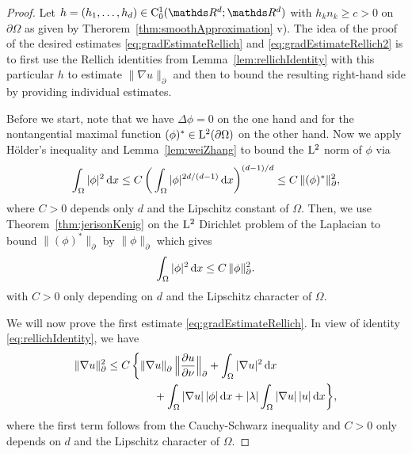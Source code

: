 \begin{proof}
  Let $h = (h_1, \dots, h_d) \in \CC_0^1(\R^d; \R^d)$ with $h_k n_k \geq c > 0$ on $\partial \Omega$ as given by Therorem~\ref{thm:smoothApproximation} v). 
  The idea of the proof of the desired estimates \eqref{eq:gradEstimateRellich} and \eqref{eq:gradEstimateRellich2} is to first use the Rellich identities from Lemma~\ref{lem:rellichIdentity} with this particular $h$ to estimate $\|\nabla u\|^{}_\partial$ and then to bound the resulting right-hand side by providing individual estimates.

  Before we start, note that we have $\Delta \phi = 0$ on the one hand and for the nontangential maximal function $(\phi)^* \in \mathrm{L}^2(\partial\Omega)$ on the other hand. 
  Now we apply Hölder's inequality and Lemma~\ref{lem:weiZhang} to bound the $\mathrm{L}^2$ norm of $\phi$ via
  \begin{align*}
    \int_\Omega |\phi|^2 \, {\operatorname{d}\!{x}} 
    \leq C\, \bigg( \int_\Omega |\phi|^{2d/(d - 1)} \, {\operatorname{d}\!{x}} \bigg)^{(d - 1)/d}
    \leq C\, \|(\phi)^* \|_\partial^2,
  \end{align*}
  where $C > 0$ depends only $d$ and the Lipschitz constant of $\Omega$.
  Then, we use Theorem~\ref{thm:jerisonKenig} on the $\mathrm{L}^2$ Dirichlet problem of the Laplacian to bound $\|(\phi)^*\|_\partial$ by $\|\phi\|_\partial$ which gives
  \begin{align}
    \label{eq:dahlbergEstimate}
    \int_\Omega |\phi|^2 \, {\operatorname{d}\!{x}} \leq C\, \|\phi\|_\partial^2.
  \end{align}
  with $C > 0$ only depending on $d$ and the Lipschitz character of $\Omega$.

  We will now prove the first estimate \eqref{eq:gradEstimateRellich}.
  In view of identity \eqref{eq:rellichIdentity}, we have
  \begin{align}
    \label{eq:normRellich}
    \begin{alignedat}{1}
    \|\nabla u\|_\partial^2
      &\leq C \, \bigg\{ \|\nabla u\|^{}_\partial \, \Big\| \frac{\partial u}{\partial \nu} \Big\|^{}_\partial + \int_\Omega |\nabla u|^2 \, {\operatorname{d}\!{x}} \\
    &\hspace{1.5cm}+ \int_\Omega |\nabla u| \, |\phi| \, {\operatorname{d}\!{x}} + |\lambda| \int_\Omega |\nabla u|\, |u| \, {\operatorname{d}\!{x}} \bigg\},
    \end{alignedat}
  \end{align}
  where the first term follows from the Cauchy-Schwarz inequality and $C > 0$ only depends on $d$ and the Lipschitz character of $\Omega$.


\end{proof}
